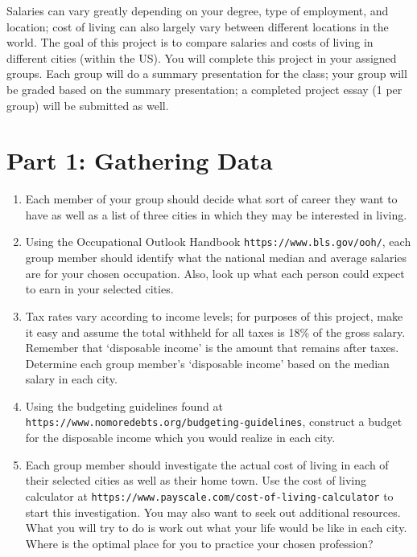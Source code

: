 \documentclass{article}
\begin{document}
Salaries can vary greatly depending on your degree, type of employment, and location; cost of living can also largely vary between different locations in the world. The goal of this project is to compare salaries and costs of living in different cities (within the US). You will complete this project in your assigned groups. Each group will do a summary presentation for the class; your group will be graded based on the summary presentation; a completed project essay (1 per group) will be submitted as well.

\section*{Part 1: Gathering Data}
\begin{enumerate}
	\item Each member of your group should decide what sort of career they want to have as well as a list of three cities in which they may be interested in living.
	\item Using the Occupational Outlook Handbook {\tt https://www.bls.gov/ooh/}, each group member should identify what the national median and average salaries are for your chosen occupation.  Also, look up what each person could expect to earn in your selected cities.
	\item Tax rates vary according to income levels; for purposes of this project, make it easy and assume the total withheld for all taxes is 18\% of the gross salary. Remember that ‘disposable income’ is the amount that remains after taxes. Determine each group member’s ‘disposable income’ based on the median salary in each city.
	\item Using the budgeting guidelines found at {\tt https://www.nomoredebts.org/budgeting-guidelines}, construct a budget for the disposable income which you would realize in each city.
	\item Each group member should investigate the actual cost of living in each of their selected cities as well as their home town.  Use the cost of living calculator at {\tt https://www.payscale.com/cost-of-living-calculator} to start this investigation.  You may also want to seek out additional resources.  What you will try to do is work out what your life would be like in each city.  Where is the optimal place for you to practice your chosen profession?
\end{enumerate}
\end{document}
